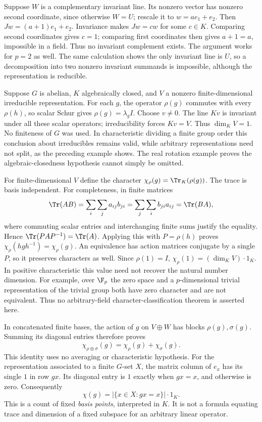 Suppose $W$ is a complementary invariant line. Its nonzero vector
has nonzero second coordinate, since otherwise $W=U$; rescale it
to $w=ae_1+e_2$. Then $Jw=(a+1)e_1+e_2$. Invariance makes
$Jw=cw$ for some $c\in K$. Comparing second coordinates gives
$c=1$; comparing first coordinates then gives $a+1=a$, impossible
in a field. Thus no invariant complement exists. The argument works
for $p=2$ as well. The same calculation shows the only invariant
line is $U$, so a decomposition into two nonzero invariant summands
is impossible, although the representation is reducible.

Suppose $G$ is abelian, $K$ algebraically closed, and $V$ a nonzero
finite-dimensional irreducible representation. For each $g$, the
operator $\rho(g)$ commutes with every $\rho(h)$, so scalar Schur
gives $\rho(g)=\lambda_gI$. Choose $v\ne0$. The line $Kv$ is
invariant under all these scalar operators; irreducibility forces
$Kv=V$. Thus $\dim_KV=1$. No finiteness of $G$ was used. In
characteristic dividing a finite group order this conclusion about
irreducibles remains valid, while arbitrary representations need
not split, as the preceding example shows. The real rotation
example proves the algebraic-closedness hypothesis cannot simply
be omitted.

For finite-dimensional $V$ define the character
$\chi_\rho(g)=\Tr_K(\rho(g))$. The trace is basis independent.
For completeness, in finite matrices
\[
 \Tr(AB)=\sum_i\sum_j a_{ij}b_{ji}
        =\sum_j\sum_i b_{ji}a_{ij}=\Tr(BA),
\]
where commuting scalar entries and interchanging finite sums justify
the equality. Hence $\Tr(PAP^{-1})=\Tr(A)$.
Applying this with $P=\rho(h)$ proves
$\chi_\rho(hgh^{-1})=\chi_\rho(g)$. An equivalence has action
matrices conjugate by a single $P$, so it preserves characters as
well. Since $\rho(1)=I$, $\chi_\rho(1)=(\dim_KV)\cdot1_K$.
In positive characteristic this value need not recover the natural
number dimension. For example, over $\F_p$ the zero space and a
$p$-dimensional trivial representation of the trivial group both
have zero character and are not equivalent. Thus no arbitrary-field
character-classification theorem is asserted here.

In concatenated finite bases, the action of $g$ on $V\oplus W$
has blocks $\rho(g),\sigma(g)$. Summing its diagonal entries
therefore proves
\[
 \chi_{\rho\oplus\sigma}(g)=\chi_\rho(g)+\chi_\sigma(g).
\]
This identity uses no averaging or characteristic hypothesis. For
the representation associated to a finite $G$-set $X$, the matrix
column of $e_x$ has its single $1$ in row $gx$. Its diagonal entry
is $1$ exactly when $gx=x$, and otherwise is zero. Consequently
\[
 \chi(g)=|\{x\in X:gx=x\}|\cdot1_K.
\]
This is a count of fixed \emph{basis points}, interpreted in $K$.
It is not a formula equating trace and dimension of a fixed subspace
for an arbitrary linear operator.
